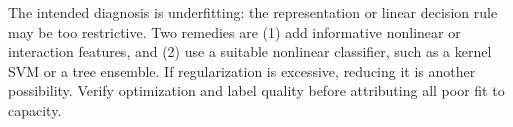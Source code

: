 The intended diagnosis is underfitting: the representation or linear decision rule may be too restrictive. Two remedies are (1) add informative nonlinear or interaction features, and (2) use a suitable nonlinear classifier, such as a kernel SVM or a tree ensemble. If regularization is excessive, reducing it is another possibility. Verify optimization and label quality before attributing all poor fit to capacity.
